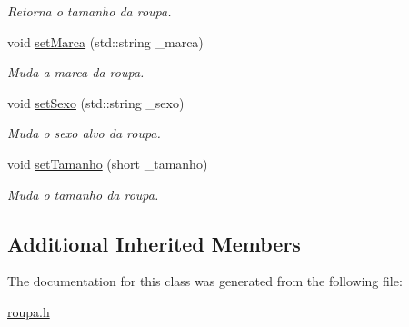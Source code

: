 \begin{DoxyCompactItemize}
\begin{DoxyCompactList}\small\item\em Retorna o tamanho da roupa. \end{DoxyCompactList}\item 
void \hyperlink{classRoupa_a779827a9b55aa33229413fa441f45ab7}{set\+Marca} (std\+::string \+\_\+marca)\hypertarget{classRoupa_a779827a9b55aa33229413fa441f45ab7}{}\label{classRoupa_a779827a9b55aa33229413fa441f45ab7}

\begin{DoxyCompactList}\small\item\em Muda a marca da roupa. \end{DoxyCompactList}\item 
void \hyperlink{classRoupa_af34fb921628fbe9f26174699dd1748b2}{set\+Sexo} (std\+::string \+\_\+sexo)\hypertarget{classRoupa_af34fb921628fbe9f26174699dd1748b2}{}\label{classRoupa_af34fb921628fbe9f26174699dd1748b2}

\begin{DoxyCompactList}\small\item\em Muda o sexo alvo da roupa. \end{DoxyCompactList}\item 
void \hyperlink{classRoupa_a892587a5c7a6728d6e409d3e3018f1ea}{set\+Tamanho} (short \+\_\+tamanho)\hypertarget{classRoupa_a892587a5c7a6728d6e409d3e3018f1ea}{}\label{classRoupa_a892587a5c7a6728d6e409d3e3018f1ea}

\begin{DoxyCompactList}\small\item\em Muda o tamanho da roupa. \end{DoxyCompactList}\end{DoxyCompactItemize}
\subsection*{Additional Inherited Members}


The documentation for this class was generated from the following file\+:\begin{DoxyCompactItemize}
\item 
\hyperlink{roupa_8h}{roupa.\+h}\end{DoxyCompactItemize}
